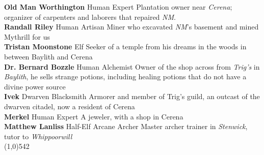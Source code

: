 \documentclass[letterpaper]{article}
\newcommand{\fullline}{\noindent\line(1,0){542} \\}
\newcommand{\person}[3]{\noindent\textbf{#1
    \ifstrequal{#2}{M}{{\color{ProcessBlue}\male}}{%
    \ifstrequal{#2}{F}{\color{VioletRed}\female}{}}}{\scriptsize #3}}
\begin{document}
\person{Old Man Worthington}{M}{Human Expert} Plantation owner near \emph{Cerena}; organizer of carpenters and laborers that repaired \emph{NM}.\\
\person{Randall Riley}{M}{Human Artisan} Miner who excavated \emph{NM}'s basement and mined Mythrill for us \\
\person{Tristan Moonstone}{M}{Elf} Seeker of a temple from his dreams in the woods in between Baylith and Cerena \\
\person{Dr. Bernard Bozzle}{M}{Human Alchemist} Owner of the shop across from \emph{Trig's} in \emph{Baylith}, he sells strange potions, including healing potions that do not have a divine power source\\
\person{Ivek}{M}{Dwarven Blacksmith} Armorer and member of Trig's guild, an outcast of the dwarven citadel, now a resident of Cerena \\
\person{Merkel}{F}{Human Expert} A jeweler, with a shop in Cerena \\
\person{Matthew Lanliss}{M}{Half-Elf Arcane Archer} Master archer trainer in \emph{Stenwick}, tutor to \emph{Whippoorwill} \\

\vspace{-1.75em}
\fullline
\vspace{-1.5em}
\end{document}
